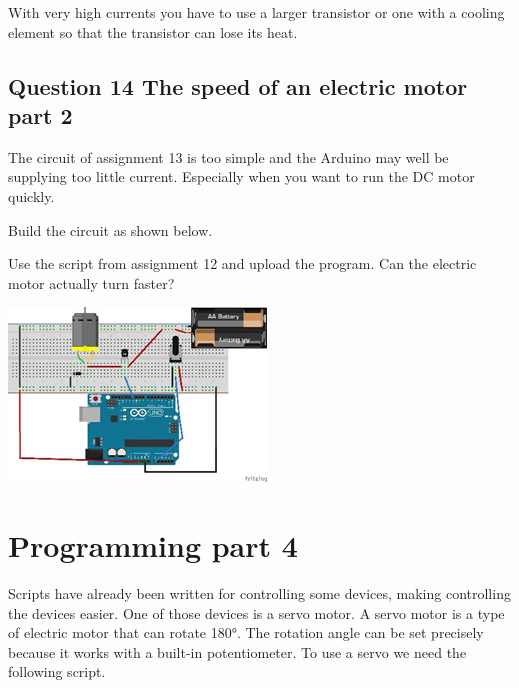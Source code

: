 \documentclass{arduino}
\begin{document}
With very high currents you have to use a larger transistor or one with a cooling element so that the transistor can lose its heat.

\subsection{Question 14 The speed of an electric motor part 2}

The circuit of assignment 13 is too simple and the Arduino may well be supplying too little current. Especially when you want to run the DC motor quickly.

\begin{alphalist}
\item Build the circuit as shown below.

\item Use the script from assignment 12 and upload the program. Can the electric motor actually turn faster?
\end{alphalist}

\begin{center}
\includegraphics[width=0.8\linewidth]{33. Circuit motor control (large current)}
\end{center}

\newpage

\section{Programming part 4}


Scripts have already been written for controlling some devices, making controlling the devices easier. One of those devices is a servo motor. A servo motor is a type of electric motor that can rotate \ang{180}. The rotation angle can be set precisely because it works with a built-in potentiometer. To use a servo we need the following script.
\end{document}
